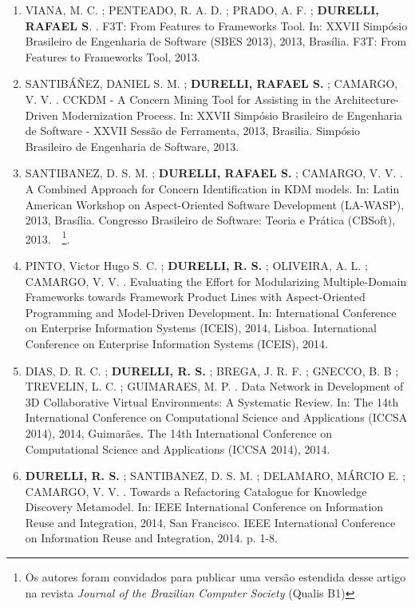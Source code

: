 \documentclass[12pt]{article}
\begin{document}
\begin{itemize}
\begin{enumerate}
		\item VIANA, M. C. ; PENTEADO, R. A. D. ; PRADO, A. F. ; \textbf{DURELLI, RAFAEL S}. . F3T: From Features to Frameworks Tool. In: XXVII Simpósio Brasileiro de Engenharia de Software (SBES 2013), 2013, Brasília. F3T: From Features to Frameworks Tool, 2013.
		
		\item SANTIBÁÑEZ, DANIEL S. M. ; \textbf{DURELLI, RAFAEL S.} ; CAMARGO, V. V. . CCKDM - A Concern Mining Tool for Assisting in the Architecture-Driven Modernization Process. In: XXVII Simpósio Brasileiro de Engenharia de Software - XXVII Sessão de Ferramenta, 2013, Brasilia. Simpósio Brasileiro de Engenharia de Software, 2013.
		
		\item SANTIBANEZ, D. S. M. ; \textbf{DURELLI, RAFAEL S.} ; CAMARGO, V. V. . A Combined Approach for Concern Identification in KDM models. In: Latin American Workshop on Aspect-Oriented Software Development (LA-WASP), 2013, Brasília. Congresso Brasileiro de Software: Teoria e Prática (CBSoft), 2013.~~\footnote{Os autores foram convidados para publicar uma versão estendida desse artigo na revista \textit{Journal of the Brazilian Computer Society} (Qualis B1)}.
		
		\item PINTO, Victor Hugo S. C. ; \textbf{DURELLI, R. S.} ; OLIVEIRA, A. L. ; CAMARGO, V. V. . Evaluating the Effort for Modularizing Multiple-Domain Frameworks towards Framework Product Lines with Aspect-Oriented Programming and Model-Driven Development. In: International Conference on Enterprise Information Systems (ICEIS), 2014, Lisboa. International Conference on Enterprise Information Systems (ICEIS), 2014.
		
		\item DIAS, D. R. C. ; \textbf{DURELLI, R. S.} ; BREGA, J. R. F. ; GNECCO, B. B ; TREVELIN, L. C. ; GUIMARAES, M. P. . Data Network in Development of 3D Collaborative Virtual Environments: A Systematic Review. In: The 14th International Conference on Computational Science and Applications (ICCSA 2014), 2014, Guimarães. The 14th International Conference on Computational Science and Applications (ICCSA 2014), 2014.
		
		\item \textbf{DURELLI, R. S.} ; SANTIBANEZ, D. S. M. ; DELAMARO, MÁRCIO E. ; CAMARGO, V. V. . Towards a Refactoring Catalogue for Knowledge Discovery Metamodel. In: IEEE International Conference on Information Reuse and Integration, 2014, San Francisco. IEEE International Conference on Information Reuse and Integration, 2014. p. 1-8.
		

\end{enumerate}
\end{itemize}
\end{document}
